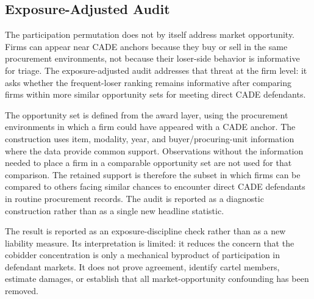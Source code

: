 \subsection{Exposure-Adjusted Audit}
\label{app:market_opportunity_submission}

The participation permutation does not by itself address market
opportunity. Firms can appear near CADE anchors because they buy
or sell in the same procurement environments, not because their
loser-side behavior is informative for triage. The
exposure-adjusted audit addresses that threat at the firm level:
it asks whether the frequent-loser ranking remains informative
after comparing firms within more similar opportunity sets for
meeting direct CADE defendants.

The opportunity set is defined from the award layer, using the
procurement environments in which a firm could have appeared
with a CADE anchor. The construction uses item, modality, year,
and buyer/procuring-unit information where the data provide
common support. Observations without the information needed to
place a firm in a comparable opportunity set are not used for
that comparison. The retained support is therefore the subset in
which firms can be compared to others facing similar chances to
encounter direct CADE defendants in routine procurement records.
The audit is reported as a diagnostic construction rather than
as a single new headline statistic.

The result is reported as an exposure-discipline check rather
than as a new liability measure. Its interpretation is limited:
it reduces the concern that the cobidder concentration is only a
mechanical byproduct of participation in defendant markets. It
does not prove agreement, identify cartel members, estimate
damages, or establish that all market-opportunity confounding
has been removed.

